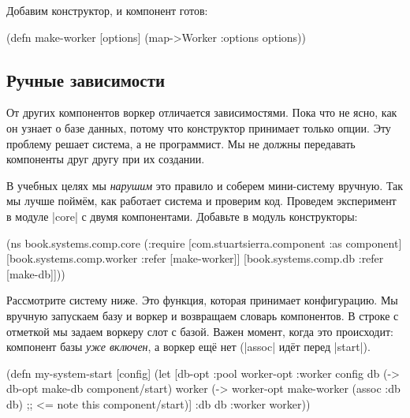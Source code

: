 \noindent
Добавим конструктор, и компонент готов:

\begin{english}
  \begin{clojure}
(defn make-worker
  [options]
  (map->Worker {:options options}))
  \end{clojure}
\end{english}

\subsection{Ручные зависимости}

От других компонентов воркер отличается зависимостями. Пока что не ясно, как
он узнает о базе данных, потому что конструктор принимает только опции. Эту
проблему решает система, а не программист. Мы не должны передавать компоненты
друг другу при их создании.

В учебных целях мы \emph{нарушим} это правило и соберем мини-систему
вручную. Так мы лучше пойм\"{е}м, как работает система и проверим код. Проведем
эксперимент в модуле \spverb|core| с двумя компонентами. Добавьте в модуль
конструкторы:

\begin{english}
  \begin{clojure}
(ns book.systems.comp.core
  (:require
   [com.stuartsierra.component :as component]
   [book.systems.comp.worker :refer [make-worker]]
   [book.systems.comp.db :refer [make-db]]))
  \end{clojure}
\end{english}

Рассмотрите систему ниже. Это функция, которая принимает конфигурацию. Мы
вручную запускаем базу и воркер и возвращаем словарь компонентов. В строке с
отметкой мы задаем воркеру слот с базой. Важен момент, когда это происходит:
компонент базы \emph{уже включен}, а воркер ещ\"{е} нет (\spverb|assoc| ид\"{е}т
перед \spverb|start|).

\begin{english}
  \begin{clojure}
(defn my-system-start
  [config]
  (let [{db-opt :pool
         worker-opt :worker} config
        db (-> db-opt
               make-db
               component/start)
        worker (-> worker-opt
                   make-worker
                   (assoc :db db) ;; <= note this
                   component/start)]
    {:db db :worker worker}))
  \end{clojure}
\end{english}

